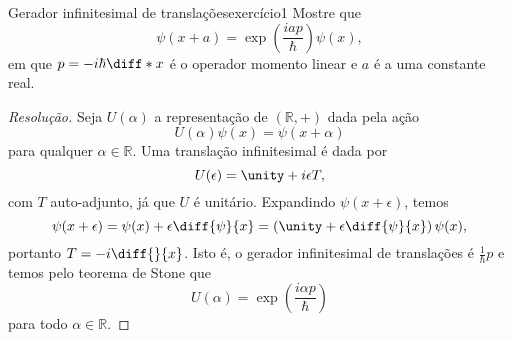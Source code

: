 \begin{exercício}{Gerador infinitesimal de translações}{exercício1}
    Mostre que
    \begin{equation*}
        \psi(x + a) = \exp\left(\frac{i a p}{\hbar}\right)\psi(x),
    \end{equation*}
    em que \(p = -i\hbar \diff*{}{x}\) é o operador momento linear e \(a\) é a uma constante real.
\end{exercício}
\begin{proof}[Resolução]
    Seja \(U(\alpha)\) a representação de \((\mathbb{R},+)\) dada pela ação
    \begin{equation*}
        U(\alpha)\psi(x) = \psi(x + \alpha)
    \end{equation*}
    para qualquer \(\alpha \in \mathbb{R}\). Uma translação infinitesimal é dada por
    \begin{equation*}
        U(\epsilon) = \unity + i \epsilon T,
    \end{equation*}
    com \(T\) auto-adjunto, já que \(U\) é unitário. Expandindo \(\psi(x + \epsilon)\), temos
    \begin{equation*}
        \psi(x + \epsilon) = \psi(x) + \epsilon \diff{\psi}{x} = \left(\unity + \epsilon\diff{\psi}{x}\right)\psi(x),
    \end{equation*}
    portanto \(T = -i \diff{}{x}\). Isto é, o gerador infinitesimal de translações é \(\frac1{\hbar}p\) e temos pelo teorema de Stone que
    \begin{equation*}
        U(\alpha) = \exp\left(\frac{i \alpha p}{\hbar}\right)
    \end{equation*}
    para todo \(\alpha \in \mathbb{R}\).
\end{proof}
